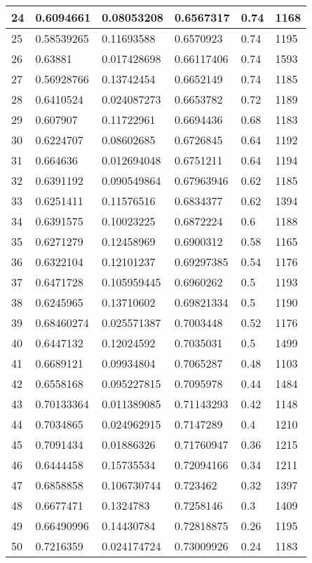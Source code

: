 \begin{longtable}{|l|l|l|l|l|l|}
24 & 0.6094661 & 0.08053208 & 0.6567317 & 0.74 & 1168 \\ \hline 
25 & 0.58539265 & 0.11693588 & 0.6570923 & 0.74 & 1195 \\ \hline 
26 & 0.63881 & 0.017428698 & 0.66117406 & 0.74 & 1593 \\ \hline 
27 & 0.56928766 & 0.13742454 & 0.6652149 & 0.74 & 1185 \\ \hline 
28 & 0.6410524 & 0.024087273 & 0.6653782 & 0.72 & 1189 \\ \hline 
29 & 0.607907 & 0.11722961 & 0.6694436 & 0.68 & 1183 \\ \hline 
30 & 0.6224707 & 0.08602685 & 0.6726845 & 0.64 & 1192 \\ \hline 
31 & 0.664636 & 0.012694048 & 0.6751211 & 0.64 & 1194 \\ \hline 
32 & 0.6391192 & 0.090549864 & 0.67963946 & 0.62 & 1185 \\ \hline 
33 & 0.6251411 & 0.11576516 & 0.6834377 & 0.62 & 1394 \\ \hline 
34 & 0.6391575 & 0.10023225 & 0.6872224 & 0.6 & 1188 \\ \hline 
35 & 0.6271279 & 0.12458969 & 0.6900312 & 0.58 & 1165 \\ \hline 
36 & 0.6322104 & 0.12101237 & 0.69297385 & 0.54 & 1176 \\ \hline 
37 & 0.6471728 & 0.105959445 & 0.6960262 & 0.5 & 1193 \\ \hline 
38 & 0.6245965 & 0.13710602 & 0.69821334 & 0.5 & 1190 \\ \hline 
39 & 0.68460274 & 0.025571387 & 0.7003448 & 0.52 & 1176 \\ \hline 
40 & 0.6447132 & 0.12024592 & 0.7035031 & 0.5 & 1499 \\ \hline 
41 & 0.6689121 & 0.09934804 & 0.7065287 & 0.48 & 1103 \\ \hline 
42 & 0.6558168 & 0.095227815 & 0.7095978 & 0.44 & 1484 \\ \hline 
43 & 0.70133364 & 0.011389085 & 0.71143293 & 0.42 & 1148 \\ \hline 
44 & 0.7034865 & 0.024962915 & 0.7147289 & 0.4 & 1210 \\ \hline 
45 & 0.7091434 & 0.01886326 & 0.71760947 & 0.36 & 1215 \\ \hline 
46 & 0.6444458 & 0.15735534 & 0.72094166 & 0.34 & 1211 \\ \hline 
47 & 0.6858858 & 0.106730744 & 0.723462 & 0.32 & 1397 \\ \hline 
48 & 0.6677471 & 0.1324783 & 0.7258146 & 0.3 & 1409 \\ \hline 
49 & 0.66490996 & 0.14430784 & 0.72818875 & 0.26 & 1195 \\ \hline 
50 & 0.7216359 & 0.024174724 & 0.73009926 & 0.24 & 1183 \\ \hline 
\end{longtable}